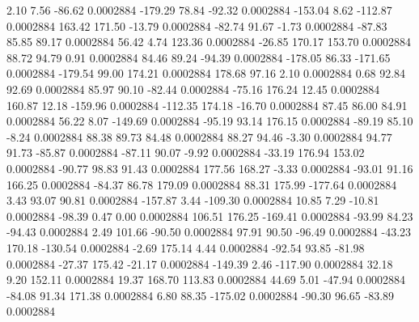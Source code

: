         2.10        7.56      -86.62     0.0002884
     -179.29       78.84      -92.32     0.0002884
     -153.04        8.62     -112.87     0.0002884
      163.42      171.50      -13.79     0.0002884
      -82.74       91.67       -1.73     0.0002884
      -87.83       85.85       89.17     0.0002884
       56.42        4.74      123.36     0.0002884
      -26.85      170.17      153.70     0.0002884
       88.72       94.79        0.91     0.0002884
       84.46       89.24      -94.39     0.0002884
     -178.05       86.33     -171.65     0.0002884
     -179.54       99.00      174.21     0.0002884
      178.68       97.16        2.10     0.0002884
        0.68       92.84       92.69     0.0002884
       85.97       90.10      -82.44     0.0002884
      -75.16      176.24       12.45     0.0002884
      160.87       12.18     -159.96     0.0002884
     -112.35      174.18      -16.70     0.0002884
       87.45       86.00       84.91     0.0002884
       56.22        8.07     -149.69     0.0002884
      -95.19       93.14      176.15     0.0002884
      -89.19       85.10       -8.24     0.0002884
       88.38       89.73       84.48     0.0002884
       88.27       94.46       -3.30     0.0002884
       94.77       91.73      -85.87     0.0002884
      -87.11       90.07       -9.92     0.0002884
      -33.19      176.94      153.02     0.0002884
      -90.77       98.83       91.43     0.0002884
      177.56      168.27       -3.33     0.0002884
      -93.01       91.16      166.25     0.0002884
      -84.37       86.78      179.09     0.0002884
       88.31      175.99     -177.64     0.0002884
        3.43       93.07       90.81     0.0002884
     -157.87        3.44     -109.30     0.0002884
       10.85        7.29      -10.81     0.0002884
      -98.39        0.47        0.00     0.0002884
      106.51      176.25     -169.41     0.0002884
      -93.99       84.23      -94.43     0.0002884
        2.49      101.66      -90.50     0.0002884
       97.91       90.50      -96.49     0.0002884
      -43.23      170.18     -130.54     0.0002884
       -2.69      175.14        4.44     0.0002884
      -92.54       93.85      -81.98     0.0002884
      -27.37      175.42      -21.17     0.0002884
     -149.39        2.46     -117.90     0.0002884
       32.18        9.20      152.11     0.0002884
       19.37      168.70      113.83     0.0002884
       44.69        5.01      -47.94     0.0002884
      -84.08       91.34      171.38     0.0002884
        6.80       88.35     -175.02     0.0002884
      -90.30       96.65      -83.89     0.0002884

